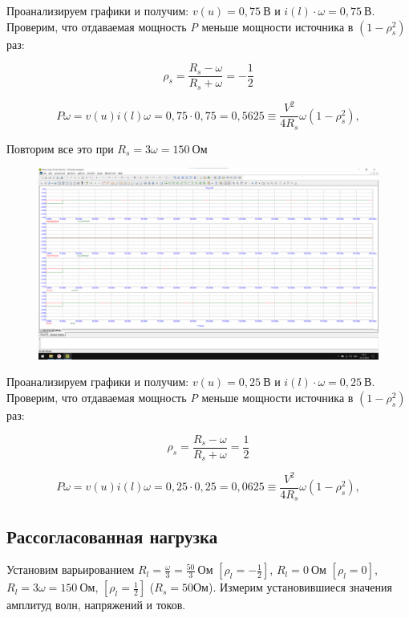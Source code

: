 \documentclass[a4paper, 12pt]{article}
\begin{document}
    Проанализируем графики и получим: $v(u) = 0,75 \: \textit{В}$ и $i(l)\cdot \omega = 0,75 \: \textit{В}$. Проверим, что отдаваемая мощность \textit{P} меньше мощности источника в $(1 - \rho_s^2)$ раз:

    \[\rho_s = \frac{R_s - \omega}{R_s + \omega} = -\frac{1}{2}\]

    \[P\omega = v(u)i(l)\omega = 0,75 \cdot 0,75 = 0,5625 \equiv \frac{V^2}{4R_s} \omega (1 - \rho_s^2),\]

    Повторим все это при $R_s = 3\omega = 150 \: \textit{Ом}$

    \begin{figure}[H]
        \centering
        \includegraphics[width = 14 cm]{images/Graph3.png}
    \end{figure}

    Проанализируем графики и получим: $v(u) = 0,25 \: \textit{В}$ и $i(l)\cdot \omega = 0,25 \: \textit{В}$. Проверим, что отдаваемая мощность \textit{P} меньше мощности источника в $(1 - \rho_s^2)$ раз:

    \[\rho_s = \frac{R_s - \omega}{R_s + \omega} = \frac{1}{2}\]

    \[P\omega = v(u)i(l)\omega = 0,25 \cdot 0,25 = 0,0625 \equiv \frac{V^2}{4R_s} \omega (1 - \rho_s^2),\]

    \subsection*{Рассогласованная нагрузка}

    Установим варьированием $R_l = \frac{\omega}{3} = \frac{50}{3} \: \textit{Ом}$ $[\rho_l = - \frac{1}{2}]$, $R_l = 0 \: \textit{Ом}$ $[\rho_l = 0]$, $R_l = 3\omega = 150 \: \textit{Ом}$, $[\rho_l =  \frac{1}{2}]$ ($R_s = 50 \textit{Ом}$). Измерим установившиеся значения амплитуд волн, напряжений и токов.
\end{document}
